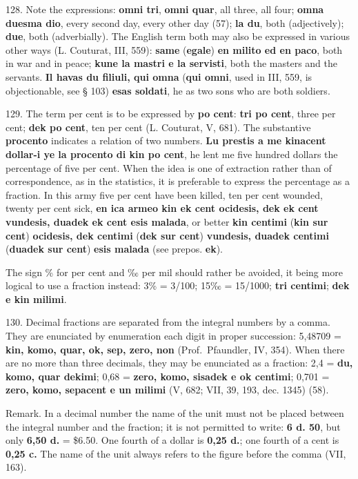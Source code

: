 128. Note the expressions: \textbf{omni tri}, \textbf{omni quar}, all three, all four; \textbf{omna duesma dio}, every second day, every other day (57); \textbf{la du}, both (adjectively); \textbf{due}, both (adverbially). The English term both may also be expressed in various other ways (L. Couturat, III, 559): \textbf{same }(\textbf{egale})\textbf{ en milito ed en paco}, both in war and in peace; \textbf{kune la mastri e la servisti}, both the masters and the servants. \textbf{Il havas du filiuli, qui omna }(\textbf{qui omni}, used in III, 559, is objectionable, see § 103)\textbf{ esas soldati}, he as two sons who are both soldiers.

129. The term per cent is to be expressed by \textbf{po cent}: \textbf{tri po cent}, three per cent; \textbf{dek po cent}, ten per cent (L. Couturat, V, 681). The substantive \textbf{procento} indicates a relation of two numbers. \textbf{Lu prestis a me kinacent dollar-i ye la procento di kin po cent}, he lent me five hundred dollars the percentage of five per cent. When the idea is one of extraction rather than of correspondence, as in the statistics, it is preferable to express the percentage as a fraction. In this army five per cent have been killed, ten per cent wounded, twenty per cent sick, \textbf{en ica armeo kin ek cent ocidesis, dek ek cent vundesis, duadek ek cent esis malada}, or better \textbf{kin centimi }(\textbf{kin sur cent})\textbf{ ocidesis, dek centimi }(\textbf{dek sur cent})\textbf{ vundesis, duadek centimi }(\textbf{duadek sur cent})\textbf{ esis malada} (see prepos. \textbf{ek}).

The sign \% for per cent and ‰ per mil should rather be avoided, it being more logical to use a fraction instead: 3\% = 3/100; 15‰ = 15/1000; \textbf{tri centimi}; \textbf{dek e kin milimi}.

130. Decimal fractions are separated from the integral numbers by a comma. They are enunciated by enumeration each digit in proper succession: 5,48709 = \textbf{kin, komo, quar, ok, sep, zero, non} (Prof.~Pfaundler, IV, 354). When there are no more than three decimals, they may be enunciated as a fraction: 2,4 = \textbf{du, komo, quar dekimi}; 0,68 = \textbf{zero, komo, sisadek e ok centimi}; 0,701 = \textbf{zero, komo, sepacent e un milimi} (V, 682; VII, 39, 193, dec. 1345) (58).

\small Remark. In a decimal number the name of the unit must not be placed between the integral number and the fraction; it is not permitted to write: \textbf{6 d. 50}, but only \textbf{6,50 d.} = \$6.50. One fourth of a dollar is \textbf{0,25 d.}; one fourth of a cent is \textbf{0,25 c.} The name of the unit always refers to the figure before the comma (VII, 163). \normalsize

